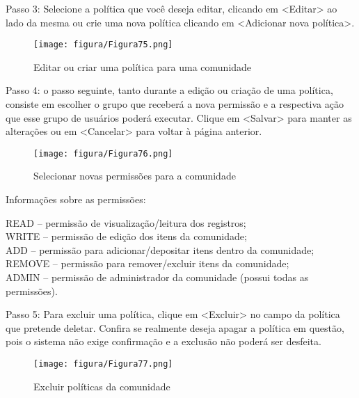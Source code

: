 \documentclass[12pt,hidelinks]{article}
\begin{document}
    Passo 3: Selecione a política que você deseja editar, clicando em <Editar> ao lado da mesma ou crie uma nova política clicando em <Adicionar nova política>. 
    
    \begin{figure}[!htp]
                \centering
                \texttt{[image: figura/Figura75.png]}
                \caption{Editar ou criar uma política para uma comunidade}
            \label{Rotulo}
        \end{figure}

\newpage
    
    Passo 4: o passo seguinte, tanto durante a edição ou criação de uma política, consiste em escolher o grupo que receberá a nova permissão e a respectiva ação que esse grupo de usuários poderá executar. Clique em <Salvar> para manter as alterações ou em <Cancelar> para voltar à página anterior.
    
    \begin{figure}[!htp]
                \centering
                \texttt{[image: figura/Figura76.png]}
                \caption{Selecionar novas permissões para a comunidade}
            \label{Rotulo}
        \end{figure}
    
    Informações sobre as permissões:
    
    \singlespacing
    
    READ – permissão de visualização/leitura dos registros; \\
    WRITE – permissão de edição dos itens da comunidade; \\
    ADD – permissão para adicionar/depositar itens dentro da comunidade; \\
    REMOVE – permissão para remover/excluir itens da comunidade; \\
    ADMIN – permissão de administrador da comunidade (possui todas as permissões).
    
    \singlespacing
    
    Passo 5: Para excluir uma política, clique em <Excluir> no campo da política que pretende deletar. Confira se realmente deseja apagar a política em questão, pois o sistema não exige confirmação e a exclusão não poderá ser desfeita.
    
    \begin{figure}[!htp]
                \centering
                \texttt{[image: figura/Figura77.png]}
                \caption{Excluir políticas da comunidade}
            \label{Rotulo}
        \end{figure}
\end{document}
